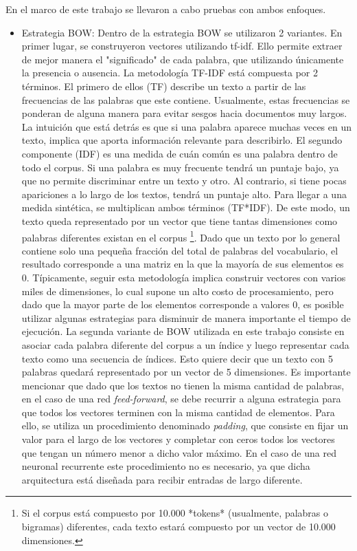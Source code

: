 \documentclass[
  12pt,
  spanish,
]{article}
\begin{document}
En el marco de este trabajo se llevaron a cabo pruebas con ambos
enfoques.

\begin{itemize}

  \item Estrategia BOW: Dentro de la estrategia BOW se utilizaron 2 variantes. En primer lugar, se construyeron vectores utilizando tf-idf. Ello permite extraer de mejor manera el "significado" de cada palabra, que utilizando únicamente la presencia o ausencia. La metodología TF-IDF está compuesta por 2 términos. El primero de ellos (TF) describe un texto a partir de las frecuencias de las palabras que este contiene. Usualmente, estas frecuencias se ponderan de alguna manera para evitar sesgos hacia documentos muy largos. La intuición que está detrás es que si una palabra aparece muchas veces en un texto, implica que aporta información relevante para describirlo. El segundo componente (IDF) es una medida de cuán común es una palabra dentro de todo el corpus. Si una palabra es muy frecuente tendrá un puntaje bajo, ya que no permite discriminar entre un texto y otro. Al contrario, si tiene pocas apariciones a lo largo de los textos, tendrá un puntaje alto. Para llegar a una medida sintética, se multiplican ambos términos (TF*IDF). 
\newline
\newline De este modo, un texto queda representado por un vector que tiene tantas dimensiones como palabras diferentes existan en el corpus \footnote{ Si el corpus está compuesto por 10.000 *tokens* (usualmente, palabras o bigramas) diferentes, cada texto estará compuesto por un vector de 10.000 dimensiones.}. Dado que un texto por lo general contiene solo una pequeña fracción del total de palabras del vocabulario, el resultado corresponde a una matriz en la que la mayoría de sus elementos es 0. Típicamente, seguir esta metodología implica construir vectores con varios miles de dimensiones, lo cual supone un alto costo de procesamiento, pero dado que la mayor parte de los elementos corresponde a valores 0, es posible utilizar algunas estrategias para disminuir de manera importante el tiempo de ejecución. 
\newline
\newline La segunda variante de BOW utilizada en este trabajo consiste en asociar cada palabra diferente del corpus a un índice y luego representar cada texto como una secuencia de índices. Esto quiere decir que un texto con 5 palabras quedará representado por un vector de 5 dimensiones. Es importante mencionar que dado que los textos no tienen la misma cantidad de palabras, en el caso de una red \textit{feed-forward}, se debe recurrir a alguna estrategia para que todos los vectores terminen con la misma cantidad de elementos. Para ello, se utiliza un procedimiento denominado \textit{padding}, que consiste en fijar un valor para el largo de los vectores y completar con ceros todos los vectores que tengan un número menor a dicho valor máximo. En el caso de una red neuronal recurrente este procedimiento no es necesario, ya que dicha arquitectura está diseñada para recibir entradas de largo diferente.          

\end{itemize}
\end{document}
